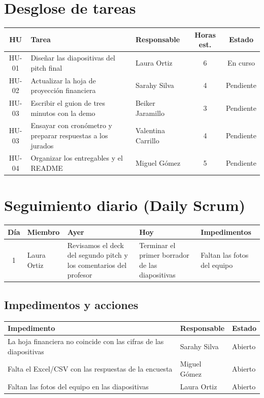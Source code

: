 \documentclass[11pt,a4paper]{article}
\begin{document}
\section{Desglose de tareas}

\begin{tabularx}{\textwidth}{c X l c c}
  \toprule
  \textbf{HU} & \textbf{Tarea} & \textbf{Responsable} & \textbf{Horas est.} & \textbf{Estado} \\
  \midrule
  HU-01 & Diseñar las diapositivas del pitch final & Laura Ortiz & 6 & En curso \\
  HU-02 & Actualizar la hoja de proyección financiera & Sarahy Silva & 4 & Pendiente \\
  HU-03 & Escribir el guion de tres minutos con la demo & Beiker Jaramillo & 3 & Pendiente \\
  HU-03 & Ensayar con cronómetro y preparar respuestas a los jurados & Valentina Carrillo & 4 & Pendiente \\
  HU-04 & Organizar los entregables y el README & Miguel Gómez & 5 & Pendiente \\
  \bottomrule
\end{tabularx}

\section{Seguimiento diario (Daily Scrum)}

\begin{tabularx}{\textwidth}{c l X X X}
  \toprule
  \textbf{Día} & \textbf{Miembro} & \textbf{Ayer} & \textbf{Hoy} & \textbf{Impedimentos} \\
  \midrule
  1 & Laura Ortiz & Revisamos el deck del segundo pitch y los comentarios del profesor & Terminar el primer borrador de las diapositivas & Faltan las fotos del equipo \\
  \bottomrule
\end{tabularx}

\subsection{Impedimentos y acciones}

\begin{tabularx}{\textwidth}{X l l}
  \toprule
  \textbf{Impedimento} & \textbf{Responsable} & \textbf{Estado} \\
  \midrule
  La hoja financiera no coincide con las cifras de las diapositivas & Sarahy Silva & Abierto \\
  Falta el Excel/CSV con las respuestas de la encuesta & Miguel Gómez & Abierto \\
  Faltan las fotos del equipo en las diapositivas & Laura Ortiz & Abierto \\
  \bottomrule
\end{tabularx}
\end{document}

